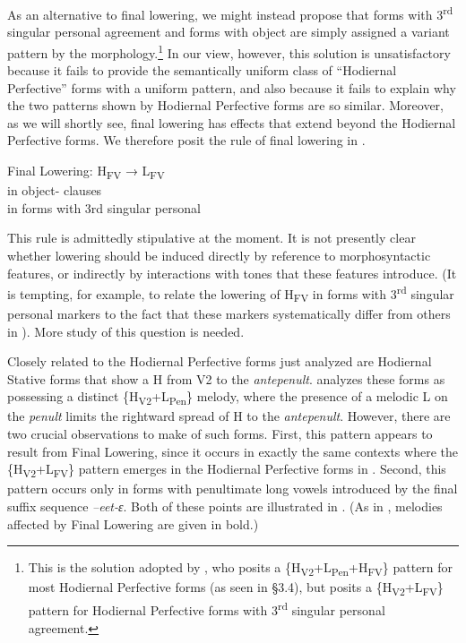 \documentclass[output=paper
,newtxmath
,modfonts
,nonflat]{langsci/langscibook}
\begin{document}
As an alternative to final lowering, we might instead propose that forms with 3\textsuperscript{rd} singular personal agreement and forms with object  are simply assigned a variant  pattern by the morphology.\footnote{This is the solution adopted by \citet{Roberts-Kohno2014}, who posits a \{H\textsubscript{V2}+L\textsubscript{Pen}+H\textsubscript{FV}\} pattern for most Hodiernal Perfective forms (as seen in §3.4), but posits a \{H\textsubscript{V2}+L\textsubscript{FV}\} pattern for Hodiernal Perfective forms with 3\textsuperscript{rd} singular personal agreement.} In our view, however, this solution is unsatisfactory because it fails to provide the semantically uniform class of “Hodiernal Perfective” forms with a uniform  pattern, and also because it fails to explain why the two  patterns shown by Hodiernal Perfective forms are so similar. Moreover, as we will shortly see, final lowering has effects that extend beyond the Hodiernal Perfective forms. We therefore posit the rule of final lowering in .

\ea\label{ex:jones:7}
\label{bkm:Ref359194361}Final Lowering: H\textsubscript{FV} → L\textsubscript{FV} \\
\ea\label{ex:jones:7a}
in object- clauses\\
\ex\label{ex:jones:7b}
in forms with 3rd singular personal  \\
\z
\z


This rule is admittedly stipulative at the moment. It is not presently clear whether lowering should be induced directly by reference to morphosyntactic features, or indirectly by interactions with tones that these features introduce. (It is tempting, for example, to relate the lowering of H\textsubscript{FV} in forms with 3\textsuperscript{rd} singular personal  markers to the fact that these markers systematically differ from others in ). More study of this question is needed.

Closely related to the Hodiernal Perfective forms just analyzed are Hodiernal Stative forms that show a H  from V2 to the \textit{antepenult}. \citet{Roberts-Kohno2014} analyzes these forms as possessing a distinct \{H\textsubscript{V2}+L\textsubscript{Pen}\} melody, where the presence of a melodic L on the \textit{penult} limits the rightward spread of H to the \textit{antepenult}. However, there are two crucial observations to make of such forms. First, this  pattern appears to result from Final Lowering, since it occurs in exactly the same contexts where the \{H\textsubscript{V2}+L\textsubscript{FV}\} pattern emerges in the Hodiernal Perfective forms in . Second, this pattern occurs only in forms with penultimate long vowels introduced by the final suffix sequence \textit{–eet-ɛ}. Both of these points are illustrated in . (As in , melodies affected by Final Lowering are given in bold.)
\end{document}
